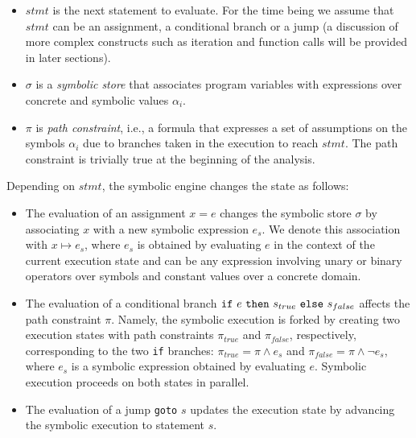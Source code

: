 \begin{itemize}

\item $stmt$ is the next statement to evaluate. For the time being we assume that $stmt$ can be an assignment, a conditional branch or a jump (a discussion of more complex constructs such as iteration and function calls will be provided in later sections).

\item $\sigma$ is a {\em symbolic store} that associates program variables with expressions over concrete and symbolic values $\alpha_i$.

  \item $\pi$ is {\em path constraint}, i.e., a formula that expresses a set of assumptions on the symbols $\alpha_i$ due to branches taken in the execution to reach $stmt$. The path constraint is trivially true at the beginning of the analysis.

\end{itemize}

\noindent Depending on $stmt$, the symbolic engine changes the state as follows:
\begin{itemize}
  \item The evaluation of an assignment $x=e$ changes the symbolic store $\sigma$ by associating $x$ with a new symbolic expression $e_s$. We denote this association with $x\mapsto e_s$, where $e_s$ is obtained by evaluating $e$ in the context of the current execution state and  can be any expression involving unary or binary operators over symbols and constant values over a concrete domain.
  

  \item The evaluation of a conditional branch ${\tt if}~e~{\tt then}~s_{true}~{\tt else}~s_{false}$ affects the path constraint $\pi$. Namely, the symbolic execution is forked by creating two execution states with path constraints $\pi_{true}$ and $\pi_{false}$, respectively, corresponding to the two {\tt if} branches: $\pi_{true}=\pi \wedge e_s$ and $\pi_{false}=\pi \wedge \neg e_s$, where $e_s$ is a symbolic expression obtained by evaluating $e$. 
    Symbolic execution proceeds on both states in parallel.

  \item The evaluation of a jump {\tt goto} $s$ updates the execution state by advancing the symbolic execution to statement $s$. 
\end{itemize}

